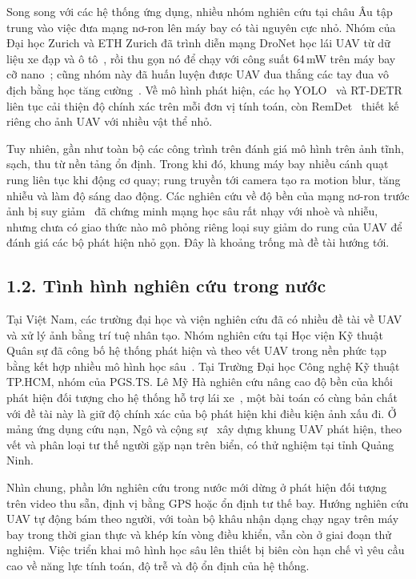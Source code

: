 Song song với các hệ thống ứng dụng, nhiều nhóm nghiên cứu tại châu Âu tập trung vào việc đưa mạng nơ-ron lên máy bay có tài nguyên cực nhỏ. Nhóm của Đại học Zurich và ETH Zurich đã trình diễn mạng DroNet học lái UAV từ dữ liệu xe đạp và ô tô~\cite{loquercio2018dronet}, rồi thu gọn nó để chạy với công suất 64\,mW trên máy bay cỡ nano~\cite{palossi2019nano}; cũng nhóm này đã huấn luyện được UAV đua thắng các tay đua vô địch bằng học tăng cường~\cite{kaufmann2023racing}. Về mô hình phát hiện, các họ YOLO~\cite{redmon2016yolo,wang2023yolov7,wang2024yolov10,ultralytics} và RT-DETR~\cite{zhao2024rtdetr} liên tục cải thiện độ chính xác trên mỗi đơn vị tính toán, còn RemDet~\cite{li2025remdet} thiết kế riêng cho ảnh UAV với nhiều vật thể nhỏ.

Tuy nhiên, gần như toàn bộ các công trình trên đánh giá mô hình trên ảnh tĩnh, sạch, thu từ nền tảng ổn định. Trong khi đó, khung máy bay nhiều cánh quạt rung liên tục khi động cơ quay; rung truyền tới camera tạo ra motion blur, tăng nhiễu và làm độ sáng dao động. Các nghiên cứu về độ bền của mạng nơ-ron trước ảnh bị suy giảm~\cite{hendrycks2019imagenetc,michaelis2019winter,dodge2016quality} đã chứng minh mạng học sâu rất nhạy với nhoè và nhiễu, nhưng chưa có giao thức nào mô phỏng riêng loại suy giảm do rung của UAV để đánh giá các bộ phát hiện nhỏ gọn. Đây là khoảng trống mà đề tài hướng tới.

\subsection*{1.2. Tình hình nghiên cứu trong nước}

Tại Việt Nam, các trường đại học và viện nghiên cứu đã có nhiều đề tài về UAV và xử lý ảnh bằng trí tuệ nhân tạo. Nhóm nghiên cứu tại Học viện Kỹ thuật Quân sự đã công bố hệ thống phát hiện và theo vết UAV trong nền phức tạp bằng kết hợp nhiều mô hình học sâu~\cite{phung2021drone}. Tại Trường Đại học Công nghệ Kỹ thuật TP.HCM, nhóm của PGS.TS. Lê Mỹ Hà nghiên cứu nâng cao độ bền của khối phát hiện đối tượng cho hệ thống hỗ trợ lái xe~\cite{tran2021adas}, một bài toán có cùng bản chất với đề tài này là giữ độ chính xác của bộ phát hiện khi điều kiện ảnh xấu đi. Ở mảng ứng dụng cứu nạn, Ngô và cộng sự~\cite{ngo2026drowning} xây dựng khung UAV phát hiện, theo vết và phân loại tư thế người gặp nạn trên biển, có thử nghiệm tại tỉnh Quảng Ninh.

Nhìn chung, phần lớn nghiên cứu trong nước mới dừng ở phát hiện đối tượng trên video thu sẵn, định vị bằng GPS hoặc ổn định tư thế bay. Hướng nghiên cứu UAV tự động bám theo người, với toàn bộ khâu nhận dạng chạy ngay trên máy bay trong thời gian thực và khép kín vòng điều khiển, vẫn còn ở giai đoạn thử nghiệm. Việc triển khai mô hình học sâu lên thiết bị biên còn hạn chế vì yêu cầu cao về năng lực tính toán, độ trễ và độ ổn định của hệ thống.


